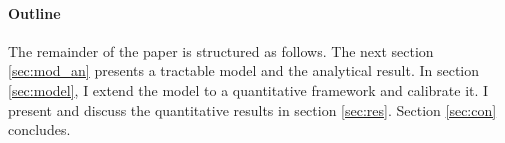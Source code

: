

\paragraph{Outline}
The remainder of the paper is structured as follows. The next section \ref{sec:mod_an} presents a tractable model and the analytical result. In section \ref{sec:model}, I extend the model to a quantitative framework and calibrate it. I present and discuss the quantitative results in section \ref{sec:res}. Section \ref{sec:con} concludes.
